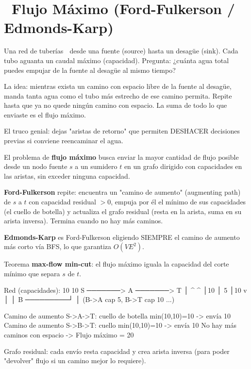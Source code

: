 \chapter[\emj{🚰}~Flujo Máximo (Ford-Fulkerson / Edmonds-Karp)]{~Flujo Máximo (Ford-Fulkerson / Edmonds-Karp)}

\begin{dsaquees}

Una red de tuberías 🚰 desde una fuente (source) hasta un desagüe
(sink). Cada tubo aguanta un caudal máximo (capacidad). Pregunta: ¿cuánta
agua total puedes empujar de la fuente al desagüe al mismo tiempo?

La idea: mientras exista un camino con espacio libre de la fuente al
desagüe, manda tanta agua como el tubo más estrecho de ese camino
permita. Repite hasta que ya no quede ningún camino con espacio. La
suma de todo lo que enviaste es el flujo máximo.

El truco genial: dejas "aristas de retorno" que permiten DESHACER
decisiones previas si conviene reencaminar el agua.

\end{dsaquees}

\begin{dsaotraforma}

El problema de \textbf{flujo máximo} busca enviar la mayor cantidad de
flujo posible desde un nodo fuente $s$ a un sumidero $t$ en un grafo
dirigido con capacidades en las aristas, sin exceder ninguna capacidad.

\textbf{Ford-Fulkerson} repite: encuentra un "camino de aumento"
(augmenting path) de $s$ a $t$ con capacidad residual $>0$, empuja por él
el mínimo de sus capacidades (el cuello de botella) y actualiza el grafo
residual (resta en la arista, suma en su arista inversa). Termina cuando
no hay más caminos.

\textbf{Edmonds-Karp} es Ford-Fulkerson eligiendo SIEMPRE el camino de
aumento más corto vía BFS, lo que garantiza $O(V E^2)$.

Teorema \textbf{max-flow min-cut}: el flujo máximo iguala la capacidad del
corte mínimo que separa $s$ de $t$.

\end{dsaotraforma}

\begin{dsadiagrama}
Red (capacidades):
        10        10
   S ───────> A ───────> T
   │          ^          ^
   │10        │ 5        │10
   v          │          │
   B ─────────┘          │
        (B->A cap 5, B->T cap 10 ...)

Camino de aumento S->A->T: cuello de botella min(10,10)=10 -> envía 10
Camino de aumento S->B->T: cuello min(10,10)=10 -> envía 10
No hay más caminos con espacio -> Flujo máximo = 20

Grafo residual: cada envío resta capacidad y crea arista inversa
(para poder "devolver" flujo si un camino mejor lo requiere).
\end{dsadiagrama}

